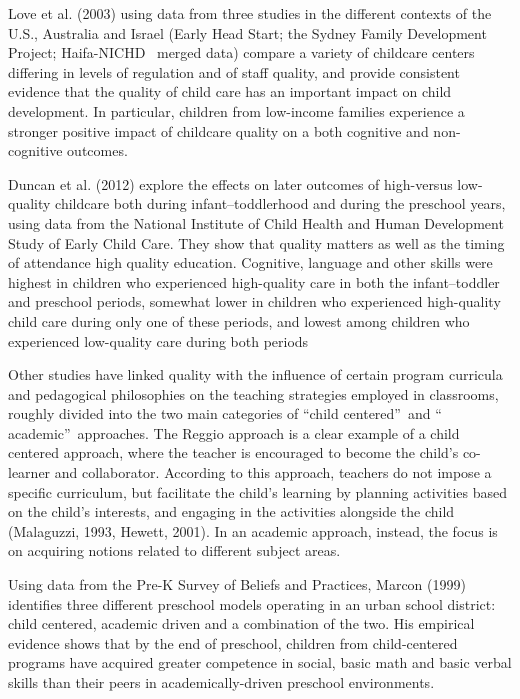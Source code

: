 \documentclass[12pt]{article}
\begin{document}
Love et al. (2003) using data from three studies in the different contexts
of the U.S., Australia and Israel (Early Head Start; the Sydney Family
Development Project; Haifa-NICHD \ merged data) compare a variety of
childcare centers differing in levels of regulation and of staff quality,
and provide consistent evidence that the quality of child care has an
important impact on child development. In particular, children from
low-income families experience a stronger positive impact of childcare
quality on a both cognitive and non-cognitive outcomes.

Duncan et al. (2012) explore the effects on later outcomes of high-versus
low-quality childcare both during infant--toddlerhood and during the
preschool years, using data from the National Institute of Child Health and
Human Development Study of Early Child Care. They show that quality matters
as well as the timing of attendance high quality education. Cognitive,
language and other skills were highest in children who experienced
high-quality care in both the infant--toddler and preschool periods,
somewhat lower in children who experienced high-quality child care during
only one of these periods, and lowest among children who experienced
low-quality care during both periods

Other studies have linked quality with the influence of certain program
curricula and pedagogical philosophies on the teaching strategies employed
in classrooms, roughly divided into the two main categories of
\textquotedblleft child centered\textquotedblright\ and \textquotedblleft
academic\textquotedblright\ approaches. The Reggio approach is a clear
example of a child centered approach, where the teacher is encouraged to
become the child's co-learner and collaborator. According to this approach,
teachers do not impose a specific curriculum, but facilitate the child's
learning by planning activities based on the child's interests, and engaging
in the activities alongside the child (Malaguzzi, 1993, Hewett, 2001). In an
academic approach, instead, the focus is on acquiring notions related to
different subject areas.

Using data from the Pre-K Survey of Beliefs and Practices, Marcon (1999)
identifies three different preschool models operating in an urban school
district: child centered, academic driven and a combination of the two. His
empirical evidence shows that by the end of preschool, children from
child-centered programs have acquired greater competence in social, basic
math and basic verbal skills than their peers in academically-driven
preschool environments.
\end{document}
